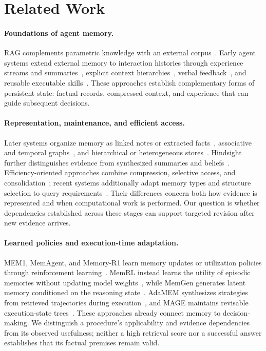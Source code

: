 \section{Related Work}
\label{sec:related_work}

\paragraph{Foundations of agent memory.}
RAG complements parametric knowledge with an external corpus~\citep{mrw_rag}. Early agent systems extend external memory to interaction histories through experience streams and summaries~\citep{mrw_generative_agents,mrw_memorybank}, explicit context hierarchies~\citep{mrw_memgpt}, verbal feedback~\citep{mrw_reflexion}, and reusable executable skills~\citep{mrw_voyager}. These approaches establish complementary forms of persistent state: factual records, compressed context, and experience that can guide subsequent decisions.

\paragraph{Representation, maintenance, and efficient access.}
Later systems organize memory as linked notes or extracted facts~\citep{mrw_amem,mrw_mem0}, associative and temporal graphs~\citep{mrw_hipporag,mrw_hipporag2,mrw_zep,mrw_magma}, and hierarchical or heterogeneous stores~\citep{mrw_memtree,mrw_memoryos,mrw_memos}. Hindsight further distinguishes evidence from synthesized summaries and beliefs~\citep{mrw_hindsight}. Efficiency-oriented approaches combine compression, selective access, and consolidation~\citep{mrw_readagent,mrw_lightmem,mrw_simplemem}; recent systems additionally adapt memory types and structure selection to query requirements~\citep{mrw_leanmem,mrw_mesa}. Their differences concern both how evidence is represented and when computational work is performed. Our question is whether dependencies established across these stages can support targeted revision after new evidence arrives.

\paragraph{Learned policies and execution-time adaptation.}
MEM1, MemAgent, and Memory-R1 learn memory updates or utilization policies through reinforcement learning~\citep{mrw_mem1,mrw_memagent,mrw_memory_r1}. MemRL instead learns the utility of episodic memories without updating model weights~\citep{mrw_memrl}, while MemGen generates latent memory conditioned on the reasoning state~\citep{mrw_memgen}. AdaMEM synthesizes strategies from retrieved trajectories during execution~\citep{mrw_adamem}, and MAGE maintains revisable execution-state trees~\citep{mrw_execution_state}. These approaches already connect memory to decision-making. We distinguish a procedure's applicability and evidence dependencies from its observed usefulness; neither a high retrieval score nor a successful answer establishes that its factual premises remain valid.

